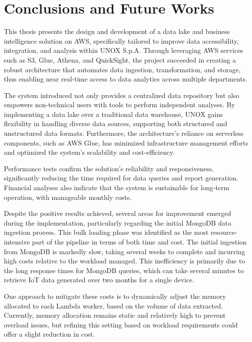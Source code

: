 
\chapter{Conclusions and Future Works}
\label{chp:conclusions}
This thesis presents the design and development of a data lake and business intelligence solution on \ac{AWS}, specifically tailored to improve data accessibility, integration, and analysis within UNOX S.p.A. Through leveraging \ac{AWS} services such as \ac{S3}, Glue, Athena, and QuickSight, the project succeeded in creating a robust architecture that automates data ingestion, transformation, and storage, thus enabling near real-time access to data analytics across multiple departments.

The system introduced not only provides a centralized data repository but also empowers non-technical users with tools to perform independent analyses. By implementing a data lake over a traditional data warehouse, UNOX gains flexibility in handling diverse data sources, supporting both structured and unstructured data formats. Furthermore, the architecture's reliance on serverless components, such as \ac{AWS} Glue, has minimized infrastructure management efforts and optimized the system's scalability and cost-efficiency.

Performance tests confirm the solution's reliability and responsiveness, significantly reducing the time required for data queries and report generation. Financial analyses also indicate that the system is sustainable for long-term operation, with manageable monthly costs.

Despite the positive results achieved, several areas for improvement emerged during the implementation, particularly regarding the initial MongoDB data ingestion process. This bulk loading phase was identified as the most resource-intensive part of the pipeline in terms of both time and cost. The initial ingestion from MongoDB is markedly slow, taking several weeks to complete and incurring high costs relative to the workload managed. This inefficiency is primarily due to the long response times for MongoDB queries, which can take several minutes to retrieve \ac{IoT} data generated over two months for a single device. 

One approach to mitigate these costs is to dynamically adjust the memory allocated to each Lambda worker, based on the volume of data extracted. Currently, memory allocation remains static and relatively high to prevent overload issues, but refining this setting based on workload requirements could offer a slight reduction in cost.

